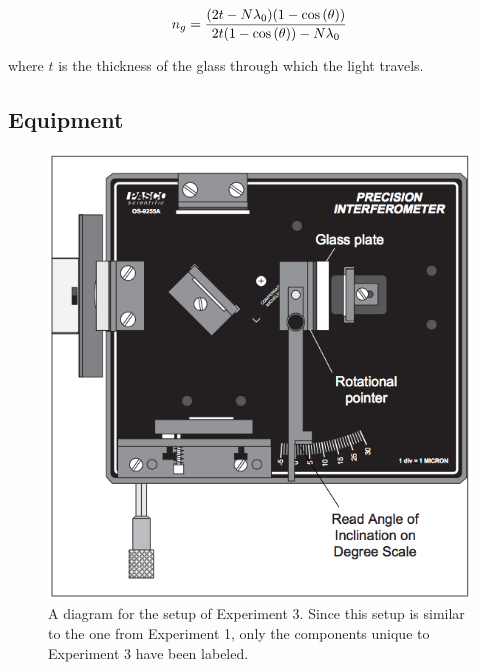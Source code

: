 \documentclass[12pt]{article}
\begin{document}
\begin{equation}
  \label{eqn:indexRefGlass}
  n_g = \frac{(2 t - N \lambda_0) (1 - \cos{(\theta)})}{2 t (1 - \cos{(\theta)})
  - N \lambda_0} \\
\end{equation}

where \(t\) is the thickness of the glass through which the light travels.

\subsection{Equipment}

\begin{figure}[H]
  \label{fig:equip3}
  \begin{center}
    \includegraphics[scale=0.7]{equip3.png}
  \end{center}
  \caption{A diagram for the setup of Experiment 3. Since this setup is similar
    to the one from Experiment 1, only the components unique to Experiment 3
    have been labeled.}
\end{figure}
\end{document}
